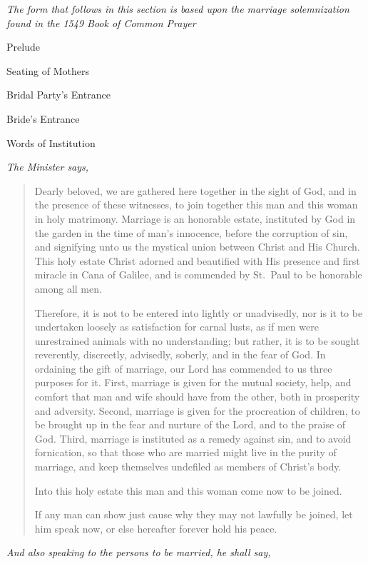 \documentclass[
]{book}
\begin{document}
\emph{The form that follows in this section is based upon the marriage solemnization found in the 1549 Book of Common Prayer}

Prelude

Seating of Mothers

Bridal Party's Entrance

Bride's Entrance

Words of Institution

\begin{center}
\emph{The Minister says,}

\end{center}

\begin{quote}
Dearly beloved, we are gathered here together in the sight of God, and in the presence of these witnesses, to join together this man and this woman in holy matrimony. Marriage is an honorable estate, instituted by God in the garden in the time of man's innocence, before the corruption of sin, and signifying unto us the mystical union between Christ and His Church. This holy estate Christ adorned and beautified with His presence and first miracle in Cana of Galilee, and is commended by St.~Paul to be honorable among all men.

Therefore, it is not to be entered into lightly or unadvisedly, nor is it to be undertaken loosely as satisfaction for carnal lusts, as if men were unrestrained animals with no understanding; but rather, it is to be sought reverently, discreetly, advisedly, soberly, and in the fear of God. In ordaining the gift of marriage, our Lord has commended to us three purposes for it. First, marriage is given for the mutual society, help, and comfort that man and wife should have from the other, both in prosperity and adversity. Second, marriage is given for the procreation of children, to be brought up in the fear and nurture of the Lord, and to the praise of God. Third, marriage is instituted as a remedy against sin, and to avoid fornication, so that those who are married might live in the purity of marriage, and keep themselves undefiled as members of Christ's body.

Into this holy estate this man and this woman come now to be joined.

If any man can show just cause why they may not lawfully be joined, let him speak now, or else hereafter forever hold his peace.
\end{quote}

\begin{center}
\emph{And also speaking to the persons to be married, he shall say,}

\end{center}
\end{document}
